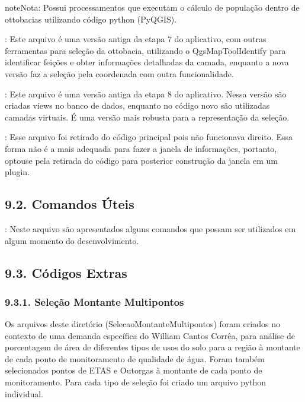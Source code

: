 \documentclass[a4paper,10pt,brazil]{sphinxmanual}
\begin{document}
\begin{sphinxadmonition}{note}{Nota:}
\sphinxAtStartPar
Possui processamentos que executam o cálculo de população dentro de ottobacias utilizando código python (PyQGIS).
\end{sphinxadmonition}

\sphinxAtStartPar
{}: Este arquivo é uma versão antiga da etapa 7 do aplicativo, com outras ferramentas para seleção da ottobacia, utilizando o QgsMapToolIdentify para identificar feições e obter informações detalhadas da camada, enquanto a nova versão faz a seleção pela coordenada com outra funcionalidade.

\sphinxAtStartPar
{}: Este arquivo é uma versão antiga da etapa 8 do aplicativo. Nessa versão são criadas views no banco de dados, enquanto no código novo são utilizadas camadas virtuais. É uma versão mais robusta para a representação da seleção.

\sphinxAtStartPar
{}: Esse arquivo foi retirado do código principal pois não funcionava direito. Essa forma não é a mais adequada para fazer a janela de informações, portanto, optou\sphinxhyphen{}se pela retirada do código para posterior construção da janela em um plugin.


\subsection{9.2. Comandos Úteis}
\label{\detokenize{9codigosAuxiliares:comandos-uteis}}
\sphinxAtStartPar
{}: Neste arquivo são apresentados alguns comandos que possam ser utilizados em algum momento do desenvolvimento.


\subsection{9.3. Códigos Extras}
\label{\detokenize{9codigosAuxiliares:codigos-extras}}

\subsubsection{9.3.1. Seleção Montante Multipontos}
\label{\detokenize{9codigosAuxiliares:selecao-montante-multipontos}}
\sphinxAtStartPar
Os arquivos deste diretório (SelecaoMontanteMultipontos) foram criados no contexto de uma demanda específica do William Cantos Corrêa, para análise de porcentagem de área de diferentes tipos de usos do solo para a região à montante de cada ponto de monitoramento de qualidade de água. Foram também selecionados pontos de ETAS e Outorgas à montante de cada ponto de monitoramento. Para cada tipo de seleção foi criado um arquivo python individual.
\end{document}
